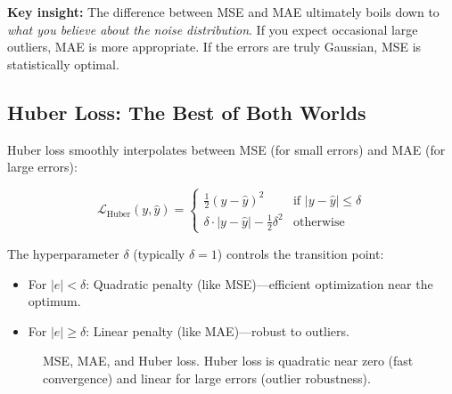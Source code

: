\textbf{Key insight:} The difference between MSE and MAE ultimately boils down to \emph{what you believe about the noise distribution}. If you expect occasional large outliers, MAE is more appropriate. If the errors are truly Gaussian, MSE is statistically optimal.

\subsection{Huber Loss: The Best of Both Worlds}

Huber loss \cite{huber1964robust} smoothly interpolates between MSE (for small errors) and MAE (for large errors):

\begin{equation}
\mathcal{L}_{\text{Huber}}(y, \hat{y}) = 
\begin{cases}
\frac{1}{2}(y - \hat{y})^2 & \text{if } |y - \hat{y}| \leq \delta \\
\delta \cdot |y - \hat{y}| - \frac{1}{2}\delta^2 & \text{otherwise}
\end{cases}
\end{equation}

The hyperparameter $\delta$ (typically $\delta = 1$) controls the transition point:
\begin{itemize}
    \item For $|e| < \delta$: Quadratic penalty (like MSE)---efficient optimization near the optimum.
    \item For $|e| \geq \delta$: Linear penalty (like MAE)---robust to outliers.
\end{itemize}

\begin{figure}[htbp]
    \centering
    \caption[Regression loss functions compared]{MSE, MAE, and Huber loss. Huber loss is quadratic near zero (fast convergence) and linear for large errors (outlier robustness).}
    \label{fig:regression_losses}
\end{figure}

